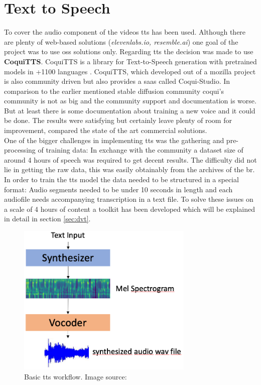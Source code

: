 \documentclass[
  a4paper,  %
  twoside,  %
  bibliography=totoc,
  headsepline,
  cleardoublepage=empty,
  parskip=half,
  draft=false
]{scrbook}
\begin{document}
\section{Text to Speech}
\label{sec:tts}
To cover the audio component of the videos \gls{tts} has been used. Although there are plenty of web-based solutions (\textit{elevenlabs.io, resemble.ai}) one goal of the project was to use \gls{oss} solutions only. Regarding \gls*{tts} the decision was made to use \textbf{CoquiTTS}. CoquiTTS is a library for Text-to-Speech generation with pretrained models in +1100 languages \cite{erenCoquiTTS2021}. CoquiTTS, which developed out of a mozilla project is also community driven but also provides a \gls{saas} called Coqui-Studio. In comparison to the earlier mentioned stable diffusion community coqui's community is not as big and the community support and documentation is worse. But at least there is some documentation about training a new voice and it could be done. The results were satisfying but certainly leave plenty of room for improvement, compared the state of the art commercial solutions. \\
One of the bigger challenges in implementing \gls{tts} was the gathering and pre-processing of training data: 
In exchange with the community a dataset size of around 4 hours of speech was required to get decent results. The difficulty did not lie in getting the raw data, this was easily obtainably from the archives of the \gls{br}. In order to train the \gls{tts} model the data needed to be structured in a special format: Audio segments needed to be under 10 seconds in length and each audiofile needs accompanying transcription in a text file. To solve these issues on a scale of 4 hours of content a toolkit has been developed which will be explained in detail in section \ref{sec:dvt}.
\begin{figure}[h]
  \centering
  \includegraphics[width=0.75\textwidth]{./graphics/images/tts/tts-workflow.png}
  \caption{Basic \gls{tts} workflow. Image source: \cite{jemineRealTimeVoiceCloning2019}}
  \label{fig:tts-explainer}
\end{figure}
\end{document}
